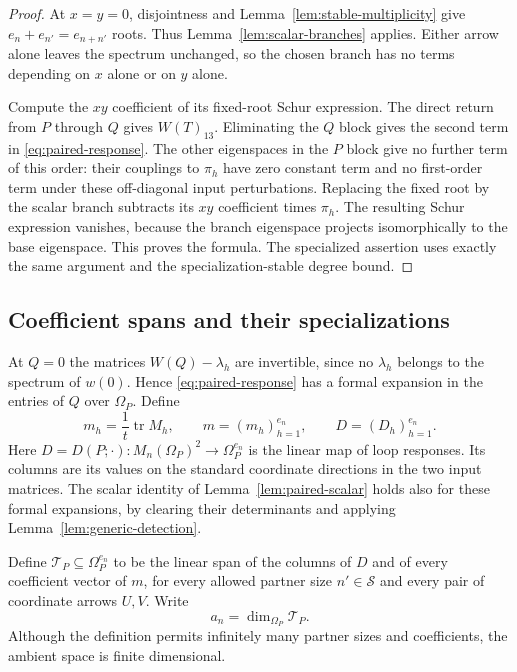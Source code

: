 \begin{proof}
At $x=y=0$, disjointness and Lemma~\ref{lem:stable-multiplicity}
give $e_n+e_{n'}=e_{n+n'}$ roots.  Thus
Lemma~\ref{lem:scalar-branches} applies.  Either arrow alone leaves
the spectrum unchanged, so the chosen branch has no terms depending
on $x$ alone or on $y$ alone.

Compute the $xy$ coefficient of its fixed-root Schur expression.
The direct return from $P$ through $Q$ gives $W(T)_{13}$.  Eliminating
the $Q$ block gives the second term in
\eqref{eq:paired-response}.  The other eigenspaces in the $P$ block
give no further term of this order: their couplings to $\pi_h$ have
zero constant term and no first-order term under these off-diagonal
input perturbations.  Replacing the fixed root by the scalar branch
subtracts its $xy$ coefficient times $\pi_h$.  The resulting Schur
expression vanishes, because the branch eigenspace projects
isomorphically to the base eigenspace.  This proves the formula.
The specialized assertion uses exactly the same argument and the
specialization-stable degree bound.
\end{proof}

\subsection{Coefficient spans and their specializations}
\label{subsec:active-space}

At $Q=0$ the matrices $W(Q)-\lambda_h$ are invertible, since no
$\lambda_h$ belongs to the spectrum of $w(0)$.  Hence
\eqref{eq:paired-response} has a formal expansion in the entries of
$Q$ over $\Omega_P$.  Define
\[
 m_h=\frac1t\operatorname{tr}M_h,
 \qquad m=(m_h)_{h=1}^{e_n},\qquad D=(D_h)_{h=1}^{e_n}.
\]
Here $D=D(P;\cdot):M_n(\Omega_P)^2\to\Omega_P^{e_n}$ is the linear
map of loop responses. Its columns are its values on the standard
coordinate directions in the two input matrices.
The scalar identity of Lemma~\ref{lem:paired-scalar} holds also for
these formal expansions, by clearing their determinants and applying
Lemma~\ref{lem:generic-detection}.

Define $\mathcal T_P\subseteq\Omega_P^{e_n}$ to be the linear span
of the columns of $D$ and of every coefficient vector of $m$, for
every allowed partner size $n'\in\mathcal S$ and every pair of
coordinate arrows $U,V$.  Write
\[
 a_n=\dim_{\Omega_P}\mathcal T_P.
\]
Although the definition permits infinitely many partner sizes and
coefficients, the ambient space is finite dimensional.

